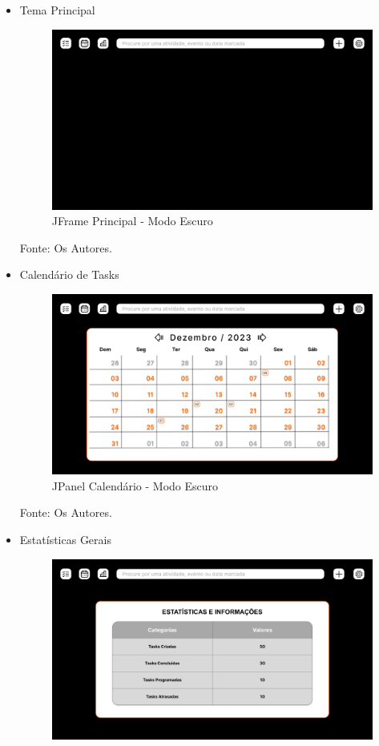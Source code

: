 \documentclass[a4paper,12pt]{article}
\begin{document}
\begin{itemize}
	\item Tema Principal
	\begin{figure}[H]
		\centering
		\includegraphics[scale=0.19]{prototypes/dark/Main Window.png}
		\caption{JFrame Principal - Modo Escuro}
	\end{figure}
	\noindent Fonte: Os Autores.
	\item Calendário de Tasks
	\begin{figure}[H]
		\centering
		\includegraphics[scale=0.19]{prototypes/dark/Calendar Panel Window.png}
		\caption{JPanel Calendário - Modo Escuro}
	\end{figure}	
	\noindent Fonte: Os Autores.
	\pagebreak
	\item Estatísticas Gerais
	\begin{figure}[H]
		\centering
		\includegraphics[scale=0.19]{prototypes/dark/Stats Panel Window.png}

\end{figure}
\end{itemize}
\end{document}
